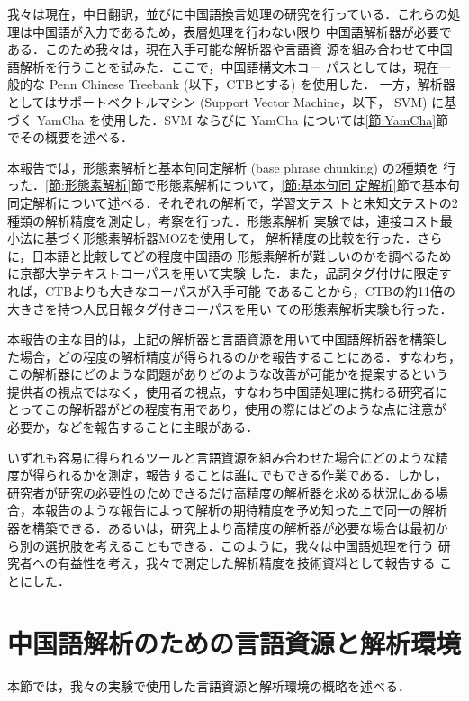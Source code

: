我々は現在，中日翻訳，並びに中国語換言処理の研究を行っている\cite{張
2002}．これらの処理は中国語が入力であるため，表層処理を行わない限り
中国語解析器が必要である．このため我々は，現在入手可能な解析器や言語資
源を組み合わせて中国語解析を行うことを試みた．ここで，中国語構文木コー
パスとしては，現在一般的な Penn Chinese Treebank (以下，CTBとする)
を使用した．
一方，解析器としてはサポートベクトルマシン (Support Vector Machine，以下，
SVM) に基づく YamCha を使用した．SVM ならびに
YamCha については\ref{節:YamCha}節でその概要を述べる．

本報告では，形態素解析と基本句同定解析 (base phrase chunking) の2種類を
行った．\ref{節:形態素解析}節で形態素解析について，\ref{節:基本句同
定解析}節で基本句同定解析について述べる．それぞれの解析で，学習文テス
トと未知文テストの2種類の解析精度を測定し，考察を行った．形態素解析
実験では，連接コスト最小法に基づく形態素解析器MOZを使用して，
解析精度の比較を行った．さらに，日本語と比較してどの程度中国語の
形態素解析が難しいのかを調べるために京都大学テキストコーパスを用いて実験
した．また，品詞タグ付けに限定すれば，CTBよりも大きなコーパスが入手可能
であることから，CTBの約11倍の大きさを持つ人民日報タグ付きコーパスを用い
ての形態素解析実験も行った．

本報告の主な目的は，上記の解析器と言語資源を用いて中国語解析器を構築し
た場合，どの程度の解析精度が得られるのかを報告することにある．すなわち，
この解析器にどのような問題がありどのような改善が可能かを提案するという
提供者の視点ではなく，使用者の視点，すなわち中国語処理に携わる研究者に
とってこの解析器がどの程度有用であり，使用の際にはどのような点に注意が
必要か，などを報告することに主眼がある．

いずれも容易に得られるツールと言語資源を組み合わせた場合にどのような精
度が得られるかを測定，報告することは誰にでもできる作業である．しかし，
研究者が研究の必要性のためできるだけ高精度の解析器を求める状況にある場
合，本報告のような報告によって解析の期待精度を予め知った上で同一の解析
器を構築できる．あるいは，研究上より高精度の解析器が必要な場合は最初か
ら別の選択肢を考えることもできる．このように，我々は中国語処理を行う
研究者への有益性を考え，我々で測定した解析精度を技術資料として報告する
ことにした．


\section{中国語解析のための言語資源と解析環境}

本節では，我々の実験で使用した言語資源と解析環境の概略を述べる．

